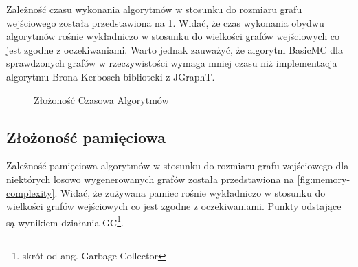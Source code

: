 \documentclass[12pt, a4paper]{article}
\begin{document}
Zależność czasu wykonania algorytmów w stosunku do rozmiaru grafu wejściowego została przedstawiona na \ref{fig:time-complexity}. Widać, że czas wykonania obydwu algorytmów rośnie wykładniczo w stosunku do wielkości grafów wejściowych co jest zgodne z oczekiwaniami. Warto jednak zauważyć, że algorytm BasicMC dla sprawdzonych grafów w rzeczywistości wymaga mniej czasu niż implementacja algorytmu Brona-Kerbosch biblioteki z JGraphT.

\begin{figure}[H]
  \begin{center}
  \end{center}
  \caption{Złożoność Czasowa Algorytmów}
  \label{fig:time-complexity}
\end{figure}
\subsection{Złożoność pamięciowa}
\label{memory_complexity}

Zależność pamięciowa algorytmów w stosunku do rozmiaru grafu wejściowego dla niektórych losowo wygenerowanych grafów została przedstawiona na \ref{fig:memory-complexity}. Widać, że zużywana pamiec rośnie wykładniczo w stosunku do wielkości grafów wejściowych co jest zgodne z oczekiwaniami. Punkty odstające są wynikiem działania GC\footnote{skrót od ang. Garbage Collector}.
\end{document}
